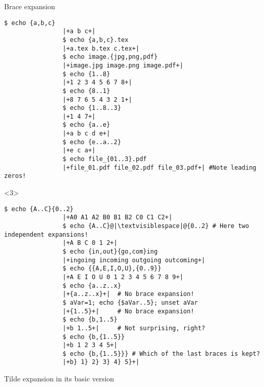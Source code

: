 \begin{frame}[fragile]{Brace expansion}
\begin{overlayarea}{\textwidth}{0.7\textheight}
\begin{onlyenv}
\begin{lstlisting}[style=MyBash, style=oddnumbers, aboveskip=5mm]
                $ echo {a,b,c}
                |+a b c+|
                $ echo {a,b,c}.tex
                |+a.tex b.tex c.tex+|
                $ echo image.{jpg,png,pdf}
                |+image.jpg image.png image.pdf+|
                $ echo {1..8}
                |+1 2 3 4 5 6 7 8+|
                $ echo {8..1}
                |+8 7 6 5 4 3 2 1+|
                $ echo {1..8..3}
                |+1 4 7+|
                $ echo {a..e}
                |+a b c d e+|
                $ echo {e..a..2}
                |+e c a+|
                $ echo file_{01..3}.pdf
                |+file_01.pdf file_02.pdf file_03.pdf+| #Note leading zeros!
            \end{lstlisting}
        \end{onlyenv}
        \begin{onlyenv}<3>
            \begin{lstlisting}[style=MyBash, style=oddnumbers, aboveskip=5mm, firstnumber=18]
                $ echo {A..C}{0..2}
                |+A0 A1 A2 B0 B1 B2 C0 C1 C2+|
                $ echo {A..C}@|\textvisiblespace|@{0..2} # Here two independent expansions!
                |+A B C 0 1 2+|
                $ echo {in,out}{go,com}ing
                |+ingoing incoming outgoing outcoming+|
                $ echo {{A,E,I,O,U},{0..9}}
                |+A E I O U 0 1 2 3 4 5 6 7 8 9+|
                $ echo {a..z..x}
                |+{a..z..x}+|  # No brace expansion!
                $ aVar=1; echo {$aVar..5}; unset aVar
                |+{1..5}+|     # No brace expansion!
                $ echo {b,1..5}
                |+b 1..5+|     # Not surprising, right?
                $ echo {b,{1..5}}
                |+b 1 2 3 4 5+|
                $ echo {b,{1..5}}} # Which of the last braces is kept?
                |+b} 1} 2} 3} 4} 5}+|
            \end{lstlisting}
        \end{onlyenv}
    \end{overlayarea}
\end{frame}
\begin{frame}{Tilde expansion in its basic version}
\end{frame}
